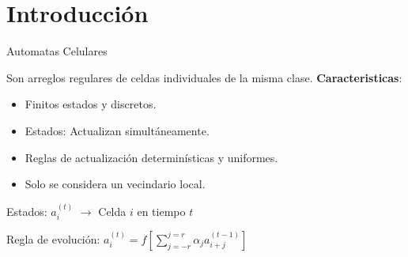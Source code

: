 \section{Introducción}

\begin{frame}{Automatas Celulares}
    \begin{block}{Son arreglos regulares de celdas individuales de la misma clase.}
    \textbf{Caracteristicas}:
        \begin{itemize}
            \item Finitos estados y discretos.
            \item Estados: Actualizan simultáneamente.
            \item Reglas de actualización determinísticas y uniformes.
            \item Solo se considera un vecindario local.
        \end{itemize}
    \end{block}

    \begin{multicols}{2}
        {Estados: $a_{i}^{(t)}$ $\rightarrow$ Celda $i$ en tiempo $t$}

        {Regla de evolución: $a_{i}^{(t)} = f \left[ \sum_{j=-r}^{j=r}  \alpha_{j} a_{i+j}^{(t-1)} \right]$}
    \end{multicols}
\end{frame}

